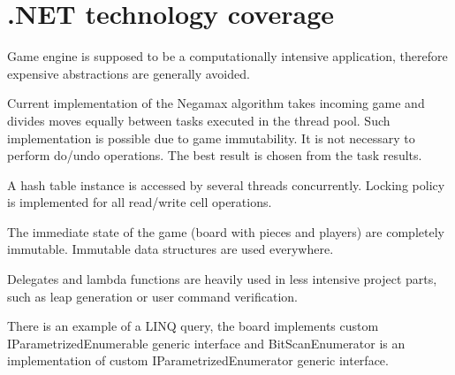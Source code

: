 \section{.NET technology coverage}

Game engine is supposed to be a computationally intensive application,
therefore expensive abstractions are generally avoided.

\vspace{0.5em}

Current implementation of the Negamax algorithm takes incoming game and
divides moves equally between tasks executed in the thread pool. Such
implementation is possible due to game immutability. It is not necessary
to perform do/undo operations. The best result is chosen from the task
results.

\vspace{0.5em}

A hash table instance is accessed by several threads concurrently. Locking
policy is implemented for all read/write cell operations.

\vspace{0.5em}

The immediate state of the game (board with pieces and players) are completely
immutable. Immutable data structures are used everywhere.

\vspace{0.5em}

Delegates and lambda functions are heavily used in less intensive project parts,
such as leap generation or user command verification.

\vspace{0.5em}

There is an example of a LINQ query, the board implements custom
IParametrizedEnumerable generic interface and BitScanEnumerator is an
implementation of custom IParametrizedEnumerator generic interface.
